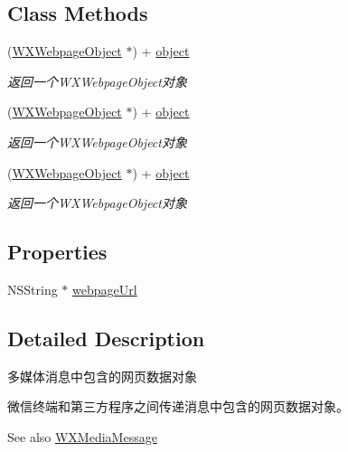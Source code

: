 \subsection*{Class Methods}
\begin{DoxyCompactItemize}
\item 
(\mbox{\hyperlink{interface_w_x_webpage_object}{W\+X\+Webpage\+Object}} $\ast$) + \mbox{\hyperlink{interface_w_x_webpage_object_a50b9c0ac9ab53b0ebf0038846d6f0baa}{object}}
\begin{DoxyCompactList}\small\item\em 返回一个\+W\+X\+Webpage\+Object对象 \end{DoxyCompactList}\item 
(\mbox{\hyperlink{interface_w_x_webpage_object}{W\+X\+Webpage\+Object}} $\ast$) + \mbox{\hyperlink{interface_w_x_webpage_object_a50b9c0ac9ab53b0ebf0038846d6f0baa}{object}}
\begin{DoxyCompactList}\small\item\em 返回一个\+W\+X\+Webpage\+Object对象 \end{DoxyCompactList}\item 
(\mbox{\hyperlink{interface_w_x_webpage_object}{W\+X\+Webpage\+Object}} $\ast$) + \mbox{\hyperlink{interface_w_x_webpage_object_a50b9c0ac9ab53b0ebf0038846d6f0baa}{object}}
\begin{DoxyCompactList}\small\item\em 返回一个\+W\+X\+Webpage\+Object对象 \end{DoxyCompactList}\end{DoxyCompactItemize}
\subsection*{Properties}
\begin{DoxyCompactItemize}
\item 
N\+S\+String $\ast$ \mbox{\hyperlink{interface_w_x_webpage_object_ad0377d01e42d37af1540a68815888d5c}{webpage\+Url}}
\end{DoxyCompactItemize}


\subsection{Detailed Description}
多媒体消息中包含的网页数据对象 

微信终端和第三方程序之间传递消息中包含的网页数据对象。 \begin{DoxySeeAlso}{See also}
\mbox{\hyperlink{interface_w_x_media_message}{W\+X\+Media\+Message}} 
\end{DoxySeeAlso}


